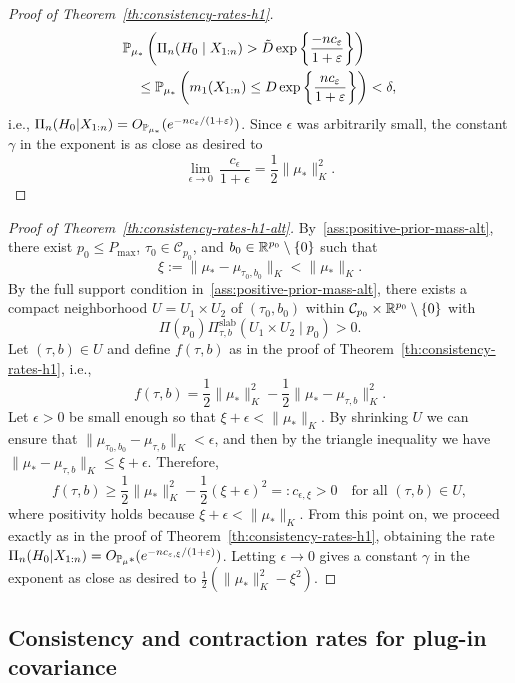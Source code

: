 \begin{proof}[Proof of Theorem~\ref{th:consistency-rates-h1}]
\begin{align*}
&\mathbb{P}_{\mu_*}\left(\Pi_n(H_0\mid X_{1:n}) > \tilde{D}\exp\left\{\frac{-nc_\varepsilon}{1+\varepsilon}\right\}\right)\\
&\quad \leq \mathbb{P}_{\mu_*}\left(m_1(X_{1:n}) \leq D \exp\left\{\frac{nc_\varepsilon}{1+\varepsilon}\right\}\right) < \delta,
\end{align*}
i.e., \(\Pi_n(H_0|X_{1:n}) = O_{\mathbb{P}_{\mu_*}}(e^{-nc_\varepsilon/(1+\varepsilon)})\). Since \(\epsilon\) was arbitrarily small, the constant \(\gamma\) in the exponent is as close as desired to 
\[
  \lim_{\epsilon\to 0}\, \frac{c_\epsilon}{1+\epsilon}=\frac{1}{2}\|\mu_*\|^2_K.
\]
\end{proof}

\begin{proof}[Proof of Theorem~\ref{th:consistency-rates-h1-alt}]\label{proof:consistency-rates-h1-alt}
  By~\ref{ass:positive-prior-mass-alt}, there exist \(p_0\leq P_{\max}\), \(\tau_0\in \mathcal C_{p_0}\), and \(b_0\in\mathbb{R}^{p_0}\setminus\{0\}\) such that
  \[
  \xi:=\|\mu_*-\mu_{\tau_0,b_0}\|_K < \|\mu_*\|_K.
  \]
  By the full support condition in~\ref{ass:positive-prior-mass-alt}, there exists a compact neighborhood \(U=U_1\times U_2\) of \((\tau_0,b_0)\) within \(\mathcal C_{p_0}\times\mathbb{R}^{p_0}\setminus\{0\}\) with 
  \[
    \Pi(p_0)\Pi_{\tau, b}^{\text{slab}}(U_1 \times U_2\mid p_0)>0.
  \]
  Let \((\tau,b)\in U\) and define \(f(\tau, b)\) as in the proof of Theorem~\ref{th:consistency-rates-h1}, i.e.,
  \[
  f(\tau, b) = \frac{1}{2}\|\mu_*\|_K^2 - \frac{1}{2}\|\mu_* - \mu_{\tau, b}\|_K^2.
  \]
  Let \(\epsilon >0\) be small enough so that \(\xi + \epsilon < \|\mu_*\|_K\). By shrinking \(U\) we can ensure that \(\|\mu_{\tau_0,b_0}-\mu_{\tau,b}\|_K < \epsilon\), and then by the triangle inequality we have \(\|\mu_*-\mu_{\tau,b}\|_K \leq \xi + \epsilon\). Therefore,
  \[
  f(\tau, b) \geq \frac{1}{2}\|\mu_*\|_K^2 - \frac{1}{2}(\xi + \epsilon)^2 =: c_{\epsilon,\xi} > 0 \quad\text{for all }(\tau,b)\in U,
  \]
  where positivity holds because \(\xi + \epsilon < \|\mu_*\|_K\). From this point on, we proceed exactly as in the proof of Theorem~\ref{th:consistency-rates-h1}, obtaining the rate \(\Pi_n(H_0|X_{1:n})=O_{\mathbb{P}_\mu*}(e^{-nc_{\varepsilon,\xi}/(1+\varepsilon)})\). Letting \(\epsilon\to 0\) gives a constant \(\gamma\) in the exponent as close as desired to \(\frac{1}{2}(\|\mu_*\|_K^2 - \xi^2)\).
\end{proof}

\subsection{Consistency and contraction rates for plug-in covariance}

